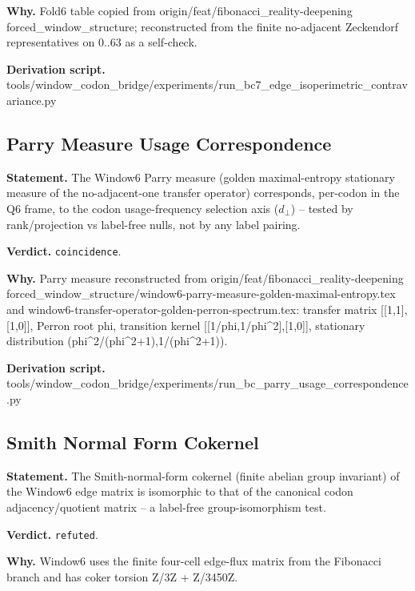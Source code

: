 \textbf{Why.} Fold6 table copied from origin/feat/fibonacci\_reality-deepening forced\_window\_structure;
reconstructed from the finite no-adjacent Zeckendorf representatives on 0..63 as a self-check.

\textbf{Derivation script.} tools/window\_codon\_bridge/experiments/run\_bc7\_edge\_isoperimetric\_contravariance.py

\subsection{Parry Measure Usage Correspondence}\label{sec:bridge-parry-measure-usage-correspondence}
\textbf{Statement.} The Window6 Parry measure (golden maximal-entropy stationary measure of the no-adjacent-one transfer
operator) corresponds, per-codon in the Q6 frame, to the codon usage-frequency selection axis
($d_{\perp}$) -- tested by rank/projection vs label-free nulls, not by any label pairing.

\textbf{Verdict.} \texttt{coincidence}.

\textbf{Why.} Parry measure reconstructed from origin/feat/fibonacci\_reality-deepening
forced\_window\_structure/window6-parry-measure-golden-maximal-entropy.tex and
window6-transfer-operator-golden-perron-spectrum.tex: transfer matrix [[1,1],[1,0]], Perron root
phi, transition kernel [[1/phi,1/phi\textasciicircum{}2],[1,0]], stationary distribution
(phi\textasciicircum{}2/(phi\textasciicircum{}2+1),1/(phi\textasciicircum{}2+1)).

\textbf{Derivation script.} tools/window\_codon\_bridge/experiments/run\_bc\_parry\_usage\_correspondence.py

\subsection{Smith Normal Form Cokernel}\label{sec:bridge-smith-normal-form-cokernel}
\textbf{Statement.} The Smith-normal-form cokernel (finite abelian group invariant) of the Window6 edge matrix is
isomorphic to that of the canonical codon adjacency/quotient matrix -- a label-free
group-isomorphism test.

\textbf{Verdict.} \texttt{refuted}.

\textbf{Why.} Window6 uses the finite four-cell edge-flux matrix from the Fibonacci branch and has coker torsion
Z/3Z + Z/3450Z.

